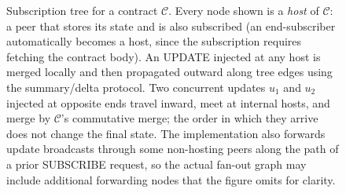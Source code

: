 \begin{figure}[t]
\caption{Subscription tree for a contract $\mathcal{C}$. Every node
shown is a \emph{host} of $\mathcal{C}$: a peer that stores its
state and is also subscribed (an end-subscriber automatically
becomes a host, since the subscription requires fetching the
contract body). An \textsf{UPDATE} injected at any host is merged
locally and then propagated outward along tree edges using the
summary/delta protocol. Two concurrent updates $u_1$ and $u_2$
injected at opposite ends travel inward, meet at internal hosts,
and merge by $\mathcal{C}$'s commutative merge; the order in which
they arrive does not change the final state. The implementation
also forwards update broadcasts through some non-hosting peers
along the path of a prior \textsf{SUBSCRIBE} request, so the actual
fan-out graph may include additional forwarding nodes that the
figure omits for clarity.}
\label{fig:subscription-tree}
\end{figure}
